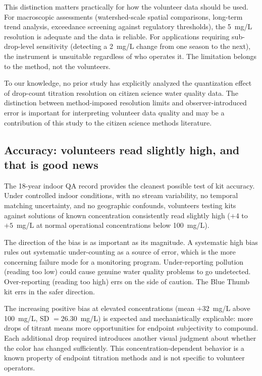 \documentclass[lineno]{wlpeerj}
\begin{document}
This distinction matters practically for how the volunteer data should be used. For macroscopic assessments (watershed-scale spatial comparisons, long-term trend analysis, exceedance screening against regulatory thresholds), the 5~mg/L resolution is adequate and the data is reliable. For applications requiring sub-drop-level sensitivity (detecting a 2~mg/L change from one season to the next), the instrument is unsuitable regardless of who operates it. The limitation belongs to the method, not the volunteers.

To our knowledge, no prior study has explicitly analyzed the quantization effect of drop-count titration resolution on citizen science water quality data. The distinction between method-imposed resolution limits and observer-introduced error is important for interpreting volunteer data quality and may be a contribution of this study to the citizen science methods literature.

\subsection{Accuracy: volunteers read slightly high, and that is good news}

The 18-year indoor QA record provides the cleanest possible test of kit accuracy. Under controlled indoor conditions, with no stream variability, no temporal matching uncertainty, and no geographic confounds, volunteers testing kits against solutions of known concentration consistently read slightly high ($+4$ to $+5$~mg/L at normal operational concentrations below 100~mg/L).

The direction of the bias is as important as its magnitude. A systematic high bias rules out systematic under-counting as a source of error, which is the more concerning failure mode for a monitoring program. Under-reporting pollution (reading too low) could cause genuine water quality problems to go undetected. Over-reporting (reading too high) errs on the side of caution. The Blue Thumb kit errs in the safer direction.

The increasing positive bias at elevated concentrations (mean $+32$~mg/L above 100~mg/L, SD $= 26.30$~mg/L) is expected and mechanistically explicable: more drops of titrant means more opportunities for endpoint subjectivity to compound. Each additional drop required introduces another visual judgment about whether the color has changed sufficiently. This concentration-dependent behavior is a known property of endpoint titration methods and is not specific to volunteer operators.
\end{document}
